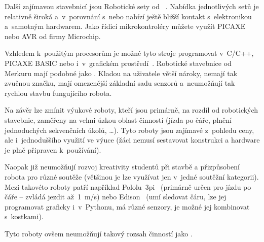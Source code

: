 
Další zajímavou stavebnicí jsou Robotické sety od ~\cite{merkur_roboticsSetsEshop}. 
Nabídka jednotlivých setů je relativně široká a~v~porovnání s~\legoM{ }nebo \fischerT{ }nabízí ještě bližší kontakt s~elektronikou a~samotným hardwarem. 
Jako řídicí mikrokontroléry můžete využít PICAXE nebo AVR od firmy Microchip. 

Vzhledem k~použitým procesorům je možné tyto stroje programovat v~C/C++, PICAXE BASIC nebo i~v~grafickém prostředí~\cite{picaxeCz_BlocklyForPICAXE}. 
Robotické stavebnice od Merkuru mají podobné  jako \fischerT. 
Kladou na uživatele větší nároky, nemají tak zvučnou značku, mají omezenější základní sadu senzorů a~neumožňují tak rychlou stavbu fungujícího robota.

Na závěr lze zmínit výukové roboty, kteří jsou primárně, na rozdíl od robotických stavebnic, zaměřeny na velmi úzkou oblast činností (jízda po čáře, plnění jednoduchých sekvenčních úkolů, \dots). 
Tyto roboty jsou zajímavé z~pohledu ceny, ale i~jednoduššího využití ve výuce (žáci nemusí sestavovat konstrukci a hardware je plně připraven k~používání). 

Naopak již neumožňují rozvoj kreativity studentů při stavbě a přizpůsobení robota pro různé soutěže (většinou je lze využívat jen v~jedné soutěžní kategorii).  
Mezi takovéto roboty patří například Pololu~3pi~\cite{robotPololu3pi} (primárně určen pro jízdu po čáře -- zvládá jezdit až~1~m/s) nebo Edison~\cite{robotEdison} (umí sledovat čáru, lze jej programovat graficky i~v~Pythonu, má různé senzory, je možné jej kombinovat s~\lego{ }kostkami). 

Tyto roboty ovšem neumožňují takový rozsah činností jako \legoM.

